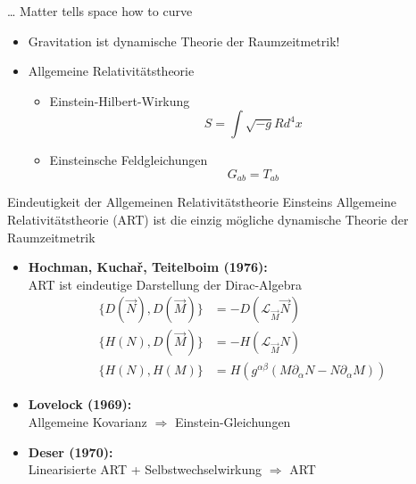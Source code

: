 \documentclass{beamer}
\begin{document}
    \begin{frame}{\ldots{} Matter tells space how to curve}
        \begin{itemize}
            \item Gravitation ist dynamische Theorie der Raumzeitmetrik!
            \item Allgemeine Relativitätstheorie
            \begin{itemize}
                \item Einstein-Hilbert-Wirkung
                \[ S = \int \sqrt{-g} R d^4 x \]
                \item Einsteinsche Feldgleichungen
                \[ G_{ab} = T_{ab} \]
            \end{itemize}
        \end{itemize}
    \end{frame}

    \begin{frame}{Eindeutigkeit der Allgemeinen Relativitätstheorie}
        Einsteins Allgemeine Relativitätstheorie (ART) ist die einzig mögliche dynamische Theorie
        der Raumzeitmetrik \pause
        \begin{itemize}
            \setlength{\belowdisplayskip}{-10pt}
            \item \textbf{Hochman, Kuchař, Teitelboim (1976):} \\ ART ist eindeutige Darstellung der Dirac-Algebra
            \begin{align*}
                \{ D(\vec N), D(\vec M) \} &= -D(\mathcal L_{\vec M} \vec N) \\
                \{ H(N), D(\vec M) \} &= -H(\mathcal L_{\vec M} N) \\
                \{ H(N), H(M) \} &= H(g^{\alpha\beta}(M\partial_\alpha N - N\partial_\alpha M))
            \end{align*} \pause
            \item \textbf{Lovelock (1969):} \\ Allgemeine Kovarianz $\Rightarrow$ Einstein-Gleichungen \pause
            \item \textbf{Deser (1970):} \\ Linearisierte ART + Selbstwechselwirkung $\Rightarrow$ ART
        \end{itemize}
    \end{frame}
\end{document}
